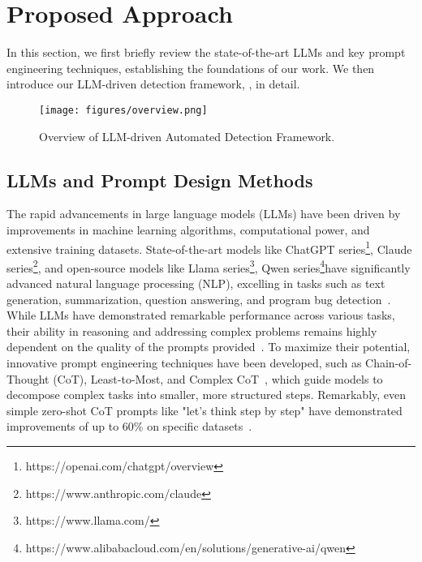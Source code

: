 \section{Proposed Approach} \label{sec:method}
In this section, we first briefly review the state-of-the-art LLMs and key prompt engineering techniques, establishing the foundations of our work. We then introduce our LLM-driven detection framework, \tool, in detail.

\begin{figure}[h]
  \centering
  \texttt{[image: figures/overview.png]}
  \caption{Overview of LLM-driven Automated Detection Framework.}
  \label{fig:overview}
\end{figure}


\subsection{LLMs and Prompt Design Methods} \label{sec:promptmethod}
The rapid advancements in large language models (LLMs) have been driven by improvements in machine learning algorithms, computational power, and extensive training datasets.
State-of-the-art models like ChatGPT series\footnote{https://openai.com/chatgpt/overview}, Claude series\footnote{https://www.anthropic.com/claude}, and open-source models like Llama series\footnote{https://www.llama.com/}, Qwen series\footnote{https://www.alibabacloud.com/en/solutions/generative-ai/qwen}have significantly advanced natural language processing (NLP), excelling in tasks such as text generation, summarization, question answering, and program bug detection~\cite{li2023adapting}.
While LLMs have demonstrated remarkable performance across various tasks, their ability  in reasoning and addressing complex problems remains highly dependent on the quality of the prompts provided~\cite{wei2022chain}. 
To maximize their potential, innovative prompt engineering techniques have been developed, such as Chain-of-Thought (CoT)\cite{wei2022chain}, Least-to-Most\cite{zhou2022least}, and Complex CoT~\cite{fu2022complexity}, which guide models to decompose complex tasks into smaller, more structured steps. 
Remarkably, even simple zero-shot CoT prompts like "let's think step by step" have demonstrated improvements of up to 60\% on specific datasets~\cite{kojima2022large}.

